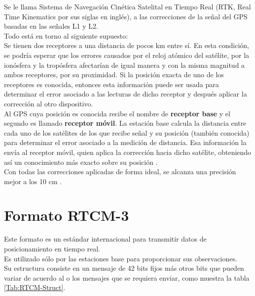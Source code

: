 Se le llama Sistema de Navegación Cinética Satelital en Tiempo Real (RTK, Real Time Kinematics por sus siglas en inglés), a las correcciones de la señal del GPS basadas en las señales L1 y L2. \\

Todo está en torno al siguiente supuesto: \\

Se tienen dos receptores a una distancia de pocos km entre sí. En esta condición, se podría esperar que los errores causados por el reloj atómico del satélite, por la ionósfera y la tropósfera afectarían de igual manera y con la misma magnitud a ambos receptores, por su proximidad. Si la posición exacta de uno de los receptores es conocida, entonces esta información puede ser usada para determinar el error asociado a las lecturas de dicho receptor y después aplicar la corrección al otro dispositivo. \\

Al GPS cuya posición es conocida recibe el nombre de \textbf{receptor base} y el segundo es llamado \textbf{receptor móvil}. La estación base calcula la distancia entre cada uno de los satélites de los que recibe señal y su posición (también conocida) para determinar el error asociado a la medición de distancia. Esa información la envía al receptor móvil, quien aplica la corrección hacia dicho satélite, obteniendo así un conocimiento más exacto sobre su posición \cite{fallas2002sistema}. \\

Con todas las correcciones aplicadas de forma ideal, se alcanza una precisión mejor a los 10 cm \cite{cerrato2011diseno}.

\section{Formato RTCM-3}

Este formato es un estándar internacional para transmitir datos de posicionamiento en tiempo real. \\

Es utilizado sólo por las estaciones base para proporcionar sus observaciones. \\

Su estructura consiste en un mensaje de 42 bits fijos más otros bits que pueden variar de acuerdo al o los mensajes que se requiera enviar, como muestra la tabla \ref{Tab:RTCM-Struct}\cite{rubinov2011review}.\\

